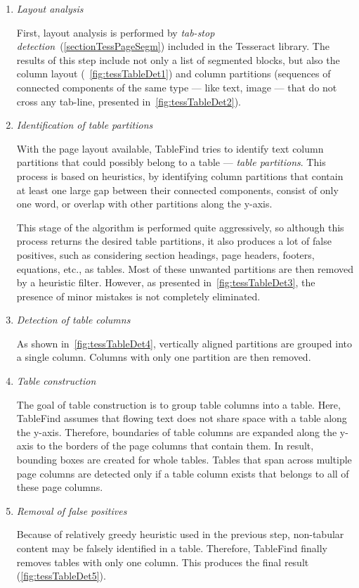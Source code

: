 \begin{enumerate}
\item \emph{Layout analysis}

First, layout analysis is performed by \emph{tab-stop detection}~(\cref{sectionTessPageSegm}) included in the Tesseract library. The results of this step include not only a list of segmented blocks, but also the column layout (~\cref{fig:tessTableDet1}) and column partitions (sequences of connected components of the same type --- like text, image --- that do not cross any tab-line, presented in~\cref{fig:tessTableDet2}).

\item \emph{Identification of table partitions}

With the page layout available, TableFind tries to identify text column partitions that could possibly belong to a table --- \emph{table partitions}. This process is based on heuristics, by identifying column partitions that contain at least one large gap between their connected components, consist of only one word, or overlap with other partitions along the y-axis.

This stage of the algorithm is performed quite aggressively, so although this process returns the desired table partitions, it also produces a lot of false positives, such as considering section headings, page headers, footers, equations, etc., as tables. Most of these unwanted partitions are then removed by a heuristic filter. However, as presented in~\cref{fig:tessTableDet3}, the presence of minor mistakes is not completely eliminated.

\item \emph{Detection of table columns}

As shown in~\cref{fig:tessTableDet4}, vertically aligned partitions are grouped into a single column. Columns with only one partition are then removed. 

\item \emph{Table construction}

The goal of table construction is to group table columns into a table. Here, TableFind assumes that flowing text does not share space with a table along the y-axis. Therefore, boundaries of table columns are expanded along the y-axis to the borders of the page columns that contain them. In result, bounding boxes are created for whole tables. Tables that span across multiple page columns are detected only if a table column exists that belongs to all of these page columns.

\item \emph{Removal of false positives}

Because of relatively greedy heuristic used in the previous step, non-tabular content may be falsely identified in a table. Therefore, TableFind finally removes tables with only one column. This produces the final result (\cref{fig:tessTableDet5}).

\end{enumerate}

